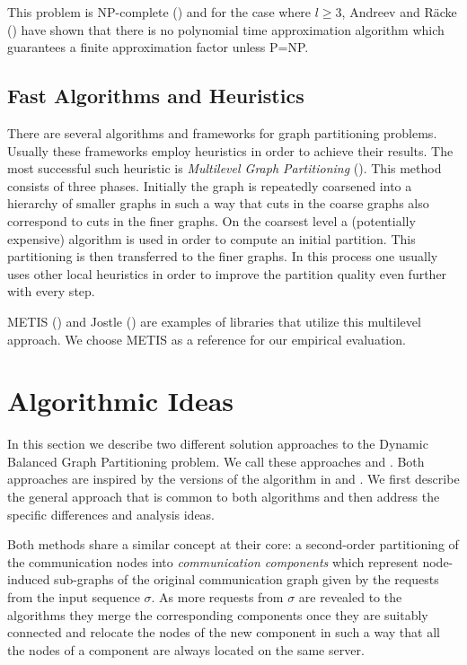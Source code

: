 \documentclass[a4paper, 10pt]{article}
\newcommand{\nl}{\newline}
\newcommand{\crep}{\text{C{\scriptsize REP}}}
\newcommand{\coreDel}{\text{C{\scriptsize REP}-C{\scriptsize ORE}}}
\newcommand{\adjDel}{\text{C{\scriptsize REP}-A{\scriptsize DJ}}}
\theoremstyle{definition}
\begin{document}
	This problem is NP-complete (\cite{Andreev2006}) and for the case where $l\geq 3$, Andreev and R\"acke (\cite{Andreev2006}) have shown that there is no polynomial time approximation algorithm which guarantees a finite approximation factor unless P=NP.
	
	\subsection{Fast Algorithms and Heuristics}
	
	There are several algorithms and frameworks for graph partitioning problems. Usually these frameworks employ heuristics in order to achieve their results. The most successful such heuristic is \textit{Multilevel Graph Partitioning} (\cite{Buluc2016}). This method consists of three phases. Initially the graph is repeatedly coarsened into a hierarchy of smaller graphs in such a way that cuts in the coarse graphs also correspond to cuts in the finer graphs. On the coarsest level a (potentially expensive) algorithm is used in order to compute an initial partition. This partitioning is then transferred to the finer graphs. In this process one usually uses other local heuristics in order to improve the partition quality even further with every step.
	
	METIS (\cite{Karypis1998, Karypis1998a}) and Jostle (\cite{Walshaw2000, walshaw2007jostle}) are examples of libraries that utilize this multilevel approach. We choose METIS as a reference for our empirical evaluation.
	
	
	\section{Algorithmic Ideas}
	\label{algIdeas}
	In this section we describe two different solution approaches to the Dynamic Balanced Graph Partitioning problem. We call these approaches \coreDel{} and \nl\adjDel{}. Both approaches are inspired by the versions of the \crep{} algorithm in \cite{Avin2015} and \cite{Avin2016}. We first describe the general approach that is common to both algorithms and then address the specific differences and analysis ideas.
	
	Both methods share a similar concept at their core: a second-order partitioning of the communication nodes into \textit{communication components} which represent node-induced sub-graphs of the original communication graph given by the requests from the input sequence $\sigma$. As more requests from $\sigma$ are revealed to the algorithms they merge the corresponding components once they are suitably connected and relocate the nodes of the new component in such a way that all the nodes of a component are always located on the same server.
	
\end{document}
